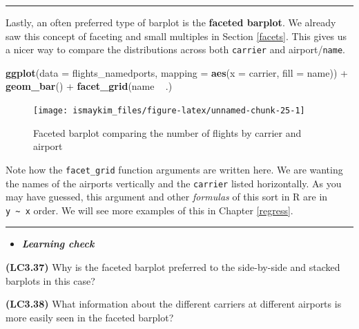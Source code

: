 \documentclass[]{tufte-book}
\newenvironment{Shaded}{\begin{snugshade}}{\end{snugshade}}
\newcommand{\KeywordTok}[1]{\textcolor[rgb]{0.13,0.29,0.53}{\textbf{{#1}}}}
\newcommand{\DataTypeTok}[1]{\textcolor[rgb]{0.13,0.29,0.53}{{#1}}}
\newcommand{\StringTok}[1]{\textcolor[rgb]{0.31,0.60,0.02}{{#1}}}
\newcommand{\NormalTok}[1]{{#1}}
\let\oldrule=\rule
\renewcommand{\rule}[1]{\oldrule{\linewidth}}
\newenvironment{rmdblock}[1]
  {\begin{shaded*}
  \begin{itemize}
  \renewcommand{\labelitemi}{
    \raisebox{-.7\height}[0pt][0pt]{
    }
  }
  \item
  }
  {
  \end{itemize}
  \end{shaded*}
  }
\newenvironment{learncheck}
  {\begin{rmdblock}{warning}}
  {\end{rmdblock}}
\begin{document}
\begin{center}\rule{0.5\linewidth}{\linethickness}\end{center}

Lastly, an often preferred type of barplot is the \textbf{faceted
barplot}. We already saw this concept of faceting and small multiples in
Section \ref{facets}. This gives us a nicer way to compare the
distributions across both \texttt{carrier} and airport/\texttt{name}.

\begin{Shaded}
\begin{Highlighting}[]
\KeywordTok{ggplot}\NormalTok{(}\DataTypeTok{data =} \NormalTok{flights_namedports, }\DataTypeTok{mapping =} \KeywordTok{aes}\NormalTok{(}\DataTypeTok{x =} \NormalTok{carrier, }\DataTypeTok{fill =} \NormalTok{name)) +}
\StringTok{  }\KeywordTok{geom_bar}\NormalTok{() +}
\StringTok{  }\KeywordTok{facet_grid}\NormalTok{(name ~}\StringTok{ }\NormalTok{.)}
\end{Highlighting}
\end{Shaded}

\begin{figure}

{\centering \texttt{[image: ismaykim\_files/figure-latex/unnamed-chunk-25-1]} 

}

\caption[Faceted barplot comparing the number of flights by carrier and airport]{Faceted barplot comparing the number of flights by carrier and airport}\label{fig:unnamed-chunk-25}
\end{figure}

Note how the \texttt{facet\_grid} function arguments are written here.
We are wanting the names of the airports vertically and the
\texttt{carrier} listed horizontally. As you may have guessed, this
argument and other \emph{formulas} of this sort in R are in
\texttt{y\ \textasciitilde{}\ x} order. We will see more examples of
this in Chapter \ref{regress}.

\begin{center}\rule{0.5\linewidth}{\linethickness}\end{center}

\begin{learncheck}
\textbf{\emph{Learning check}}
\end{learncheck}

\textbf{(LC3.37)} Why is the faceted barplot preferred to the
side-by-side and stacked barplots in this case?

\textbf{(LC3.38)} What information about the different carriers at
different airports is more easily seen in the faceted barplot?
\end{document}
